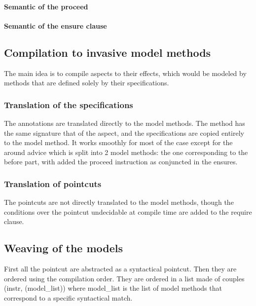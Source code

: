 \documentclass[draft]{llncs}
\begin{document}
\paragraph{Semantic of the proceed}
\paragraph{Semantic of the ensure clause}
\subsection{Compilation to invasive model methods}
The main idea is to compile aspects to their effects, which would be modeled by methods that are defined
solely by their specifications. 
\subsubsection{Translation of the specifications}
The annotations are translated directly to the model methods. The method has the same signature
that of the aspect, and the specifications are copied entirely to the model method. It works smoothly
for most of the case except for the around advice which is split into 2 model methods: the one corresponding
to the before part, with added the proceed instruction as conjuncted in the ensures.
\subsubsection{Translation of pointcuts}
The pointcuts are not directly translated to the model methods, though the conditions over the pointcut undecidable
at compile time are added to the require clause.
\subsection{Weaving of the models}
First all the pointcut are abstracted as a syntactical pointcut. Then they are ordered using the compilation
order.
They are ordered in a list made of couples (instr, (model\_list)) where model\_list is the list of model methods 
that correspond to a specific syntactical match.
\end{document}
